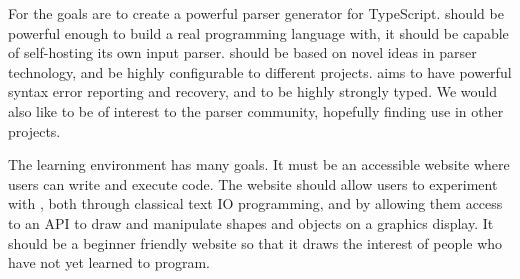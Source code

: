 For \tsPEG{} the goals are to create a powerful parser generator for TypeScript. \tsPEG{} should be powerful enough to build a real programming language with, it should be capable of self-hosting its own input parser. \tsPEG{} should be based on novel ideas in parser technology, and be highly configurable to different projects. \tsPEG{} aims to have powerful syntax error reporting and recovery, and to be highly strongly typed. We would also like \tsPEG{} to be of interest to the parser community, hopefully finding use in other projects.

The learning environment has many goals. It must be an accessible website where users can write and execute \Setanta{} code. The website should allow users to experiment with \Setanta{}, both through classical text IO programming, and by allowing them access to an API to draw and manipulate shapes and objects on a graphics display. It should be a beginner friendly website so that it draws the interest of people who have not yet learned to program.

